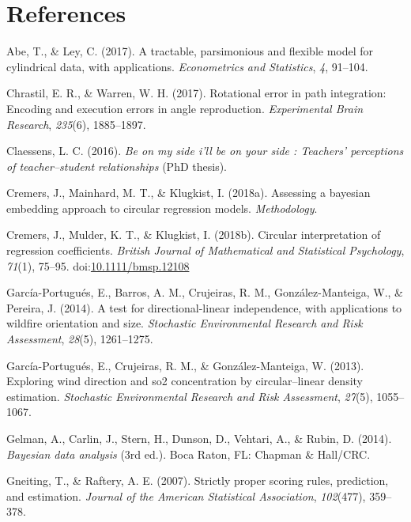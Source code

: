 \documentclass[11pt,]{article}
\begin{document}
\newpage
\section*{References}

\hypertarget{refs}{}
\leavevmode\hypertarget{ref-abe2017tractable}{}%
Abe, T., \& Ley, C. (2017). A tractable, parsimonious and flexible model
for cylindrical data, with applications. \emph{Econometrics and
Statistics}, \emph{4}, 91--104.

\leavevmode\hypertarget{ref-chrastil2017rotational}{}%
Chrastil, E. R., \& Warren, W. H. (2017). Rotational error in path
integration: Encoding and execution errors in angle reproduction.
\emph{Experimental Brain Research}, \emph{235}(6), 1885--1897.

\leavevmode\hypertarget{ref-Claessens2016side}{}%
Claessens, L. C. (2016). \emph{Be on my side i'll be on your side :
Teachers' perceptions of teacher--student relationships} (PhD thesis).

\leavevmode\hypertarget{ref-Cremers2018Assessing}{}%
Cremers, J., Mainhard, M. T., \& Klugkist, I. (2018a). Assessing a
bayesian embedding approach to circular regression models.
\emph{Methodology}.

\leavevmode\hypertarget{ref-CremersMulderKlugkist2017}{}%
Cremers, J., Mulder, K. T., \& Klugkist, I. (2018b). Circular
interpretation of regression coefficients. \emph{British Journal of
Mathematical and Statistical Psychology}, \emph{71}(1), 75--95.
doi:\href{https://doi.org/10.1111/bmsp.12108}{10.1111/bmsp.12108}

\leavevmode\hypertarget{ref-garcia2014test}{}%
García-Portugués, E., Barros, A. M., Crujeiras, R. M.,
González-Manteiga, W., \& Pereira, J. (2014). A test for
directional-linear independence, with applications to wildfire
orientation and size. \emph{Stochastic Environmental Research and Risk
Assessment}, \emph{28}(5), 1261--1275.

\leavevmode\hypertarget{ref-garcia2013exploring}{}%
García-Portugués, E., Crujeiras, R. M., \& González-Manteiga, W. (2013).
Exploring wind direction and so2 concentration by circular--linear
density estimation. \emph{Stochastic Environmental Research and Risk
Assessment}, \emph{27}(5), 1055--1067.

\leavevmode\hypertarget{ref-BDA}{}%
Gelman, A., Carlin, J., Stern, H., Dunson, D., Vehtari, A., \& Rubin, D.
(2014). \emph{Bayesian data analysis} (3rd ed.). Boca Raton, FL: Chapman
\& Hall/CRC.

\leavevmode\hypertarget{ref-gneiting2007strictly}{}%
Gneiting, T., \& Raftery, A. E. (2007). Strictly proper scoring rules,
prediction, and estimation. \emph{Journal of the American Statistical
Association}, \emph{102}(477), 359--378.
\end{document}
